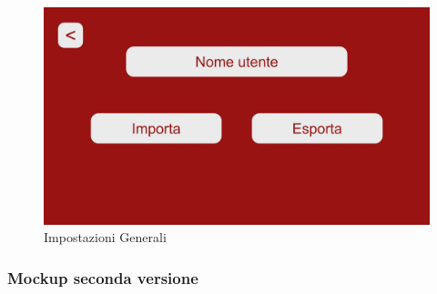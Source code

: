         \begin{figure}[H]
          \centering
          \begin{minipage}[b]{0.48\textwidth}
            \includegraphics[width=\textwidth]{Images/mockup/settings1.jpg}
            \caption{Impostazioni Generali}
            \label{fig:Settings1}
          \end{minipage}
          \hfill
        \end{figure}
        
        \subsubsection{Mockup seconda versione}\label{mockup2}
        
